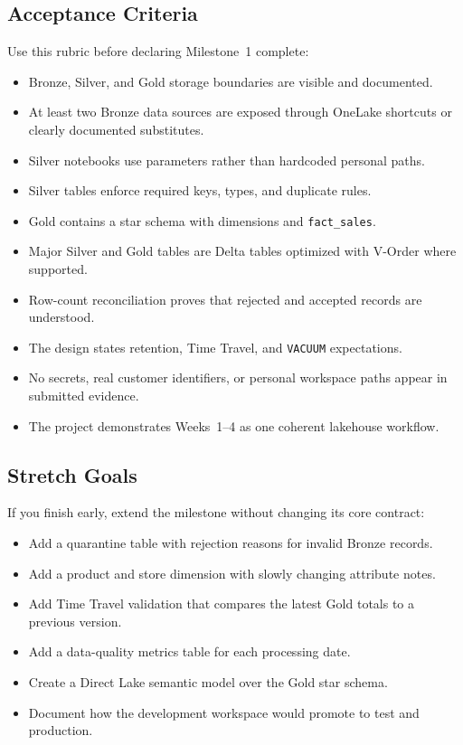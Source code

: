 \subsection*{Acceptance Criteria}
Use this rubric before declaring Milestone~1 complete:
\begin{itemize}
    \item[\(\square\)] Bronze, Silver, and Gold storage boundaries are visible and documented.
    \item[\(\square\)] At least two Bronze data sources are exposed through OneLake shortcuts or clearly documented substitutes.
    \item[\(\square\)] Silver notebooks use parameters rather than hardcoded personal paths.
    \item[\(\square\)] Silver tables enforce required keys, types, and duplicate rules.
    \item[\(\square\)] Gold contains a star schema with dimensions and \texttt{fact\_sales}.
    \item[\(\square\)] Major Silver and Gold tables are Delta tables optimized with V-Order where supported.
    \item[\(\square\)] Row-count reconciliation proves that rejected and accepted records are understood.
    \item[\(\square\)] The design states retention, Time Travel, and \texttt{VACUUM} expectations.
    \item[\(\square\)] No secrets, real customer identifiers, or personal workspace paths appear in submitted evidence.
    \item[\(\square\)] The project demonstrates Weeks~1--4 as one coherent lakehouse workflow.
\end{itemize}

\subsection*{Stretch Goals}
If you finish early, extend the milestone without changing its core contract:
\begin{itemize}
    \item Add a quarantine table with rejection reasons for invalid Bronze records.
    \item Add a product and store dimension with slowly changing attribute notes.
    \item Add Time Travel validation that compares the latest Gold totals to a previous version.
    \item Add a data-quality metrics table for each processing date.
    \item Create a Direct Lake semantic model over the Gold star schema.
    \item Document how the development workspace would promote to test and production.
\end{itemize}
